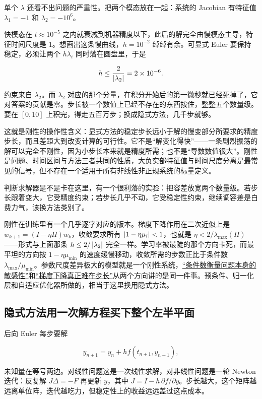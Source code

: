 单个 \(\lambda\) 还看不出问题的严重性。把两个模态放在一起：系统的 Jacobian 有特征值 \(\lambda_1=-1\) 和 \(\lambda_2=-10^{6}\)。

快模态在 \(t\approx10^{-5}\) 之内就衰减到机器精度以下，此后的解完全由慢模态主导，特征时间尺度是 \(1\)。想画出这条慢曲线，\(h=10^{-2}\) 绰绰有余。可显式 Euler 要保持稳定，必须让两个 \(h\lambda_i\) 同时落在圆盘里，于是

\[
h\le\frac{2}{\left|\lambda_2\right|}=2\times10^{-6}.
\]

约束来自 \(\lambda_2\)。而 \(\lambda_2\) 对应的那个分量，在积分开始后的第一微秒就已经死掉了，它对答案的贡献是零。步长被一个数值上已经不存在的东西按住，整整五个数量级。要在 \([0,10]\) 上积完，得走五百万步；换成隐式方法，几千步就够。

这就是刚性的操作性含义：显式方法的稳定步长远小于解的慢变部分所要求的精度步长，而且差距大到改变计算的可行性。它不是``解变化得快''——一条剧烈振荡的解可以完全不刚性，因为小步长本来就是精度所需；也不是``导数数值很大''。刚性是问题、时间区间与方法三者共同的性质，大负实部特征值与时间尺度分离是最常见的信号，但不存在一个适用于所有非线性非正规系统的标量定义。

判断求解器是不是卡在这里，有一个很利落的实验：把容差放宽两个数量级。若步长跟着变大，它受精度约束；若步长几乎不动，它受稳定性约束，继续调容差是白费力气，该换方法类别了。

刚性在训练里有一个几乎逐字对应的版本。梯度下降作用在二次近似上是 \(w_{k+1}=(I-\eta H)w_k\)，收敛要求所有 \(\left|1-\eta\mu_i\right|<1\)，也就是 \(\eta<2/\lambda_{\max}(H)\)——形式与上面那条 \(h\le2/\left|\lambda_2\right|\) 完全一样。学习率被最陡的那个方向卡死，而最平坦的方向按 \(1-\eta\mu_{\min}\) 的速度缓慢移动，收敛所需的步数正比于条件数 \(\lambda_{\max}/\mu_{\min}\)。参数尺度差异极大的模型就是一个刚性系统，\hyperref[sec:08-Numerical-Analysis/01-Floating-Point-and-Error/03]{``条件数衡量问题本身的敏感性''}和\hyperref[sec:09-Convex-Optimization/06-Optimization-Algorithms/01]{``梯度下降真正难在步长''}从两个方向讲的是同一件事。预条件、归一化层和自适应优化器所做的，相当于这里换用隐式方法。

\subsection{隐式方法用一次解方程买下整个左半平面}

后向 Euler 每步要解

\[
y_{n+1}=y_n+h f(t_{n+1},y_{n+1}),
\]

未知量在等号两边。对线性问题这是一次线性求解，对非线性问题是一轮 Newton 迭代：反复解 \(J\Delta=-F\) 再更新 \(y\)，其中 \(J=I-h\,\partial f/\partial y\)。步长越大，这个矩阵越远离单位阵，迭代越吃力，但稳定性上的收益远远盖过这点成本。

